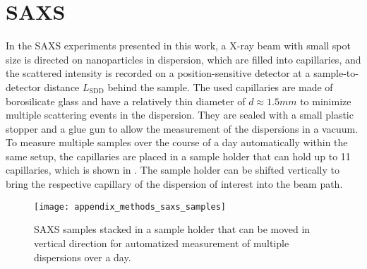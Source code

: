 \documentclass[\main/dresen_thesis.tex]{subfiles}
\begin{document}
  \section{SAXS}
    \label{app:methods:saxs}
    In the SAXS experiments presented in this work, a X-ray beam with small spot size is directed on nanoparticles in dispersion, which are filled into capillaries, and the scattered intensity is recorded on a position-sensitive detector at a sample-to-detector distance $L_\mathrm{SDD}$ behind the sample.
    The used capillaries are made of borosilicate glass and have a relatively thin diameter of $d \approx 1.5\unit{mm}$ to minimize multiple scattering events in the dispersion.
    They are sealed with a small plastic stopper and a glue gun to allow the measurement of the dispersions in a vacuum.
    To measure multiple samples over the course of a day automatically within the same setup, the capillaries are placed in a sample holder that can hold up to 11 capillaries, which is shown in .
    The sample holder can be shifted vertically to bring the respective capillary of the dispersion of interest into the beam path.
    \begin{figure}[tb]
      \centering
      \texttt{[image: appendix\_methods\_saxs\_samples]}
      \caption{\label{fig:appendix:methods:saxs:samples} SAXS samples stacked in a sample holder that can be moved in vertical direction for automatized measurement of multiple dispersions over a day. }
    \end{figure}
\end{document}
